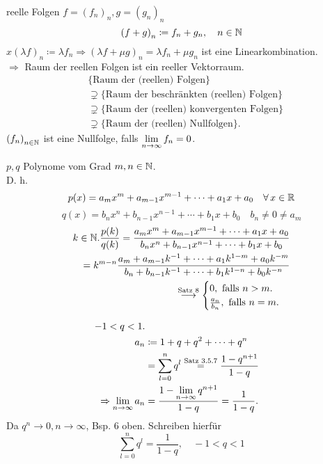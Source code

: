 \documentclass[../ana1.tex]{subfiles}
\begin{document}
reelle Folgen \(f = {(f_n)}_n, g = {(g_n)}_n  \) \\
\[ {(f+g)}_n \coloneqq f_n + g_n, \quad n\in\mathbb{N} \]
\(x {(\lambda f)}_n \coloneqq \lambda f_n \Rightarrow {(\lambda f + \mu g)}_n = \lambda f_n + \mu g_n \) ist eine Linearkombination.\\
\(\Rightarrow{}\) Raum der reellen Folgen ist ein reeller Vektorraum.
\begin{align*}
	&\{ \text{Raum der (reellen) Folgen} \} \\
	&\supsetneq \{ \text{Raum der beschränkten (reellen) Folgen} \} \\
	&\supsetneq \{ \text{Raum der (reellen) konvergenten Folgen} \} \\
	&\supsetneq \{ \text{Raum der (reellen) Nullfolgen} \}.
\end{align*}
\({(f_n)}_{n\in\mathbb{N}}\) ist eine Nullfolge, falls \( \lim\limits_{n\rightarrow\infty} f_n = 0 \).

\begin{bsp}[1]
	\( p,q \) Polynome vom Grad \(m,n\in\mathbb{N} \).\\
	D. h. \[ p(x) = a_m x^m + a_{m-1} x^{m-1} + \cdots + a_1 x + a_0 \quad \forall x\in\R \]
	\[q(x) = b_n x^n + b_{n-1} x^{n-1} + \cdots + b_1 x + b_0 \quad b_n \neq 0 \neq a_m \]
	\begin{align*}
		k\in\mathbb{N}. \frac{p(k)}{q(k)} = \frac{a_m x^m + a_{m-1} x^{m-1} + \cdots + a_1 x + a_0}{b_n x^n + b_{n-1} x^{n-1} + \cdots + b_1 x + b_0}\\
		= k^{m-n} \frac{a_m + a_{m-1} k^{-1} + \cdots + a_1 k^{1-m} + a_0 k^{-m} }{b_n + b_{n-1} k^{-1} + \cdots + b_1 k^{1-n} + b_0 k^{-n}}\\
		\overset{\text{Satz 8}}{\longrightarrow}
		\begin{cases}
			0, \text{ falls } n>m.\\
			\frac{a_n}{b_n}, \text{ falls } n = m.
		\end{cases}
	\end{align*}
\end{bsp}

\begin{bsp}
	\begin{align*}
		-1<q<1.\\
		a_n &\coloneqq 1 + q + q^2 + \cdots + q^n\\
		&= \sum_{l=0}^{n} q^l \overset{\text{Satz 3.5.7}}{=} \frac{1-q^{n+1}}{1-q}\\
		\Rightarrow \lim\limits_{n\rightarrow\infty} a_n &= \frac{1- \lim\limits_{n\rightarrow\infty} q^{n+1}}{1-q} = \frac{1}{1-q}.
	\end{align*}
	Da \(q^n \rightarrow 0, n\rightarrow\infty \), Bsp. 6 oben.
	Schreiben hierfür \[ \sum_{l=0}^{n} q^l = \frac{1}{1-q}, \quad -1<q<1 \]
\end{bsp}
\end{document}
